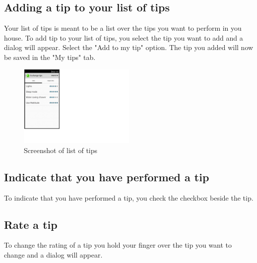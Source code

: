 \subsection{Adding a tip to your list of tips}
Your list of tips is meant to be a list over the tips you want to perform in you house. To add tip to your list of tips, you select the tip you want to add and a dialog will appear. Select the "Add to my tip" option. The tip you added will now be saved in the "My tips" tab. 

\begin{figure}[H]
\centering
\includegraphics[width=0.5\textwidth, clip, trim=0cm 4cm 19.5cm 0cm]{appendix/usermanual/fig/Tipstab.png}
\caption{Screenshot of list of tips}
\end{figure}

\subsection{Indicate that you have performed a tip}
To indicate that you have performed a tip, you check the checkbox beside the tip.
\subsection{Rate a tip}
To change the rating of a tip you hold your finger over the tip you want to change and a dialog will appear. 


